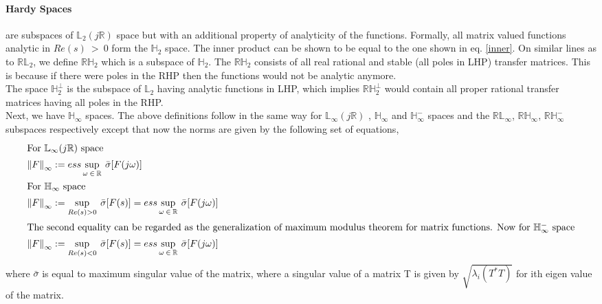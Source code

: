 \documentclass[a4paper,12pt]{article}
\newcommand\norm[1]{\left\lVert#1\right\rVert}
\begin{document}
		\paragraph{Hardy Spaces} \label{hinfnorm} are subspaces of $\mathbb{L}_{2}(j\mathbb{R})$ space but with an additional property of analyticity of the functions. Formally, all matrix valued functions analytic in $Re(s)\: > \:0$ form the $\mathbb{H}_{2}$ space. The inner product can be shown to be equal to the one shown in eq. \ref{inner}. On similar lines as to  $\mathbb{RL}_{2}$, we define  $\mathbb{RH}_{2}$ which is a subspace of $\mathbb{H}_{2}$. The $\mathbb{RH}_{2}$ consists of all real rational and stable (all poles in LHP) transfer matrices. This is because if there were poles in the RHP then the functions would not be analytic anymore.\\
		 The space $\mathbb{H}_{2}^{\perp}$ is the subspace of $\mathbb{L}_{2}$ having analytic functions in LHP, which implies  $\mathbb{RH}_{2}^{\perp}$ would contain all proper rational transfer matrices having all poles in the RHP.
		\\Next, we have  $\mathbb{H}_{\infty}$ spaces. The above definitions follow in the same way for $\mathbb{L}_{\infty}(j\mathbb{R})$ , $\mathbb{H}_{\infty}$ and $\mathbb{H}_{\infty}^{-}$ spaces and the $\mathbb{RL}_{\infty}$, $\mathbb{RH}_{\infty}$, $\mathbb{RH}_{\infty}^{-}$ subspaces respectively except that now the norms are given by the following set of equations,
		\begin{align*}
		\intertext{For $\mathbb{L}_{\infty}(j\mathbb{R})$ space}
		\norm{F}_{\infty} &:= ess \sup_{\omega\:\in\:\mathbb{R}} \: \bar{\sigma} [F(j\omega)] \\
		\intertext{For $\mathbb{H}_{\infty}$ space}
		\norm{F}_{\infty} &:= \sup_{Re(s) > 0} \: \bar{\sigma} [F(s)] = ess \sup_{\omega\:\in\:\mathbb{R}} \: \bar{\sigma} [F(j\omega)] \\
		\intertext{The second equality can be regarded as the generalization of maximum modulus theorem for matrix functions. Now for $\mathbb{H}_{\infty}^{-}$ space}
		\norm{F}_{\infty} &:= \sup_{Re(s) < 0} \: \bar{\sigma} [F(s)] = ess \sup_{\omega\:\in\:\mathbb{R}} \: \bar{\sigma} [F(j\omega)]
		\end{align*}
		where $\bar{\sigma}$ is equal to maximum singular value of the matrix, where a singular value of a matrix T is given by $\sqrt{\lambda_{i}(T^{*}T)}$ for ith eigen value of the matrix.
\end{document}

